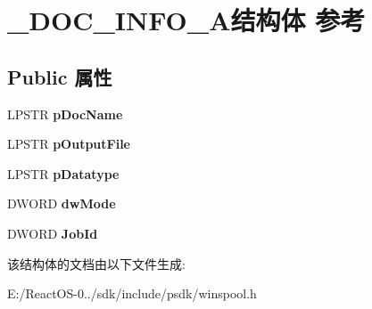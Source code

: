 \hypertarget{struct___d_o_c___i_n_f_o__2_a}{}\section{\+\_\+\+D\+O\+C\+\_\+\+I\+N\+F\+O\+\_\+A结构体 参考}
\label{struct___d_o_c___i_n_f_o__2_a}
\subsection*{Public 属性}
\begin{DoxyCompactItemize}
\item 
\mbox{\label{struct___d_o_c___i_n_f_o__2_a_a32cd31757c3f37090c84357f592b2b64}} 
L\+P\+S\+TR {\bfseries p\+Doc\+Name}
\item 
\mbox{\label{struct___d_o_c___i_n_f_o__2_a_a043a53fd35e7ffc9d5594117af4f3469}} 
L\+P\+S\+TR {\bfseries p\+Output\+File}
\item 
\mbox{\label{struct___d_o_c___i_n_f_o__2_a_a9056a1129860819a2001c5120bfd1325}} 
L\+P\+S\+TR {\bfseries p\+Datatype}
\item 
\mbox{\label{struct___d_o_c___i_n_f_o__2_a_a83b146419606a1e272ae7a574721fb27}} 
D\+W\+O\+RD {\bfseries dw\+Mode}
\item 
\mbox{\label{struct___d_o_c___i_n_f_o__2_a_aa2894c08c7d3d0606a0aef255cc0f8ca}} 
D\+W\+O\+RD {\bfseries Job\+Id}
\end{DoxyCompactItemize}


该结构体的文档由以下文件生成\+:\begin{DoxyCompactItemize}
\item 
E\+:/\+React\+O\+S-\/0../sdk/include/psdk/winspool.\+h\end{DoxyCompactItemize}
